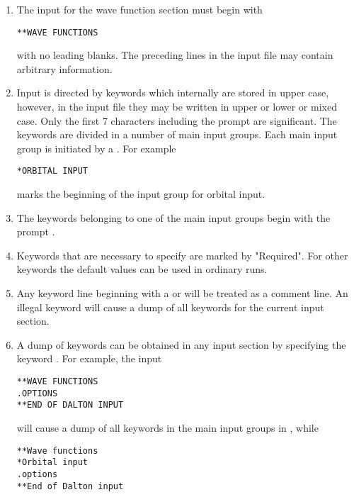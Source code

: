 \begin{enumerate}
\item {The input for the wave function section must begin with

\begin{inputex} \begin{verbatim}
**WAVE FUNCTIONS
\end{verbatim} \end{inputex}
   with no leading blanks.  The preceding lines in the input file may
   contain arbitrary information.
}
\item{Input is directed by keywords which internally are stored
   in upper case, however, in the input file they may be written in upper or lower or mixed case.
   Only the first 7 characters including the prompt are significant.
   The keywords are divided in a number of main input groups. Each main
   input group is initiated by a {\starkey}. For example

\begin{inputex} \begin{verbatim}
*ORBITAL INPUT
\end{verbatim} \end{inputex}
   marks the beginning of the input group for orbital input.
}
\item { The keywords belonging to one of the main input groups begin with
   the prompt {\dotkey}.
}
\item { Keywords that are necessary to specify are marked by "Required".
   For other keywords the default values can be used in ordinary runs.
}
\item {Any keyword line beginning with a \quotekw{!} or
   \quotekw{\#} will be treated as a
   comment line.  An illegal keyword will cause a dump of all keywords
   for the current input section.
}
\item{A dump of keywords can be obtained in any input section by
specifying the keyword .  For example, the input

\begin{inputex} \begin{verbatim}
**WAVE FUNCTIONS
.OPTIONS
**END OF DALTON INPUT
\end{verbatim} \end{inputex}

   will cause a dump  of all keywords in the main input groups in {\sir}, while

\begin{inputex} \begin{verbatim}
**Wave functions
*Orbital input
.options
**End of Dalton input
\end{verbatim} \end{inputex}

}
\end{enumerate}
